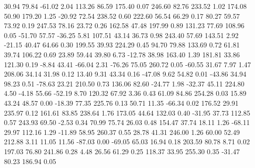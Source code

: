    30.94   79.84  -61.02    2.04
  113.26   86.59  175.40    0.07
  246.60   82.76  233.52    1.02
  174.08   50.90  179.20    1.25
  -20.92   72.54  238.52    0.60
  222.60   56.54   66.29    0.17
   80.27   59.57   73.92    0.19
  247.53   78.16   23.72    0.26
  162.58   47.48  197.99    0.89
  131.23   77.69  108.96    0.05
  -51.70   57.57  -36.25    5.81
  107.51   43.14   36.73    0.98
  243.40   57.69  143.51    2.92
  -21.15   40.47   64.66    0.30
  199.55   39.93  224.29    0.45
   94.70   79.88  133.69    0.72
   61.81   39.74  106.22    0.69
   23.89   59.44   39.80    6.73
  -12.78   38.98  163.40    1.39
  181.81   33.86  121.30    0.19
   -8.84   43.41  -66.04    2.31
  -76.26   75.05  260.72    0.05
  -60.55   31.67    7.97    1.47
  208.06   34.14   31.98    0.12
   13.40    9.31   43.34    0.16
  -47.08    9.62   54.82    0.01
  -43.86   34.94   98.23    0.51
  -78.63   23.21  210.50    0.73
  136.06   82.60  -24.77    1.98
  -32.37   45.11  224.80    4.50
   -4.18   55.66  -52.19    8.70
  120.32   67.92    3.36    0.43
   61.09   84.86  254.28    0.03
   15.89   43.24   48.57    0.00
  -18.39   77.35  225.76    0.13
   50.71   11.35  -66.34    0.02
  176.52   29.91  235.97    0.12
  161.61   83.85  238.64    1.76
  173.05   44.64  132.03    0.40
  -31.95   37.73  112.85    0.57
  243.93   69.50   -2.53    0.34
   70.99   75.74   26.03    0.48
  154.47   37.74   18.11    1.26
  -68.11   29.97  112.16    1.29
  -11.89   58.95  260.37    0.55
   28.78   41.31  246.00    1.26
   60.00   52.49  212.88    3.11
   11.05   11.56  -87.03    0.00
  -69.05   65.03   16.94    0.18
  203.59   80.78    8.71    0.02
  197.03   76.80  241.86    0.28
    4.48   26.56   61.29    0.25
  118.37   33.95  255.30    0.35
  -31.47   80.23  186.94    0.05
